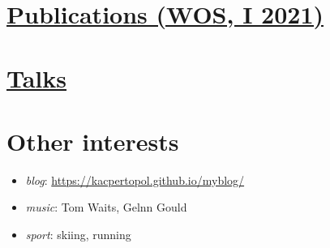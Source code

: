 \hypertarget{publications-wos-i-2021}{%
\section{\texorpdfstring{\href{./0pl.html}{Publications (WOS, I
2021)}}{Publications (WOS, I 2021)}}\label{publications-wos-i-2021}}

\hypertarget{talks}{%
\section{\texorpdfstring{\href{./00pl.html}{Talks}}{Talks}}\label{talks}}

\hypertarget{other-interests}{%
\section{Other interests}\label{other-interests}}

\begin{itemize}
\tightlist
\item
  \emph{blog}: \url{https://kacpertopol.github.io/myblog/}
\item
  \emph{music}: Tom Waits, Gelnn Gould
\item
  \emph{sport}: skiing, running
\end{itemize}
